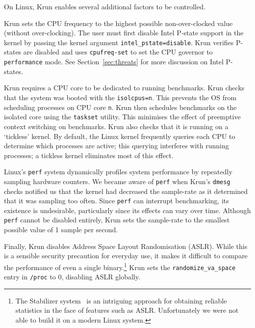 \documentclass[a4paper,UKenglish]{lipics}
\newcommand{\krun}{Krun\xspace}
\begin{document}
On Linux, \krun enables several additional factors to be controlled.

\krun sets the CPU frequency to the highest possible non-over-clocked value
(without over-clocking). The user must first disable Intel P-state support in
the kernel by passing the kernel argument \texttt{intel\_pstate=disable}.
\krun verifies P-states are disabled and uses \texttt{cpufreq-set} to set
the CPU governor to \texttt{performance} mode. See
Section~\ref{sec:threats} for more discussion on Intel P-states.

\krun requires a CPU core to be dedicated to running benchmarks. \krun
checks that the system was booted with the \texttt{isolcpus=n}. This prevents
the OS from scheduling processes on CPU core \texttt{n}. \krun then schedules
benchmarks on the isolated core using the \texttt{taskset} utility. This
minimises the effect of preemptive context switching on benchmarks. \krun also
checks that it is running on a `tickless' kernel. By default, the Linux kernel
frequently  queries each CPU to
determine which processes are active; this querying interferes with running
processes; a tickless kernel eliminates most  of this effect.

Linux's \texttt{perf} system dynamically profiles system performance by
repeatedly sampling hardware counters. We became aware of \texttt{perf} when
\krun's \texttt{dmesg} checks notified us that the kernel had decreased the
sample-rate as it determined that it was sampling too often. Since \texttt{perf}
can interrupt benchmarking, its existence is undesirable, particularly since its
effects can vary over time. Although \texttt{perf} cannot be disabled entirely,
\krun sets the sample-rate to the smallest possible value of 1 sample per
second.

Finally, \krun disables Address Space Layout Randomisation (ASLR). While this is
a sensible security precaution for everyday use, it makes it difficult to
compare the performance of even a single binary.\footnote{The Stabilizer
system~\cite{curtsinger} is an intriguing approach for obtaining reliable
statistics in the face of features such as ASLR. Unfortunately we were not able
to build it on a modern Linux system.} \krun sets the
\texttt{randomize\_va\_space} entry in \texttt{/proc} to 0, disabling ASLR
globally.
\end{document}

